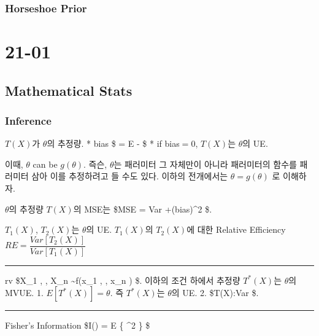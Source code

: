 \documentclass[
]{book}
\begin{document}
\hypertarget{horseshoe-prior}{%
\section{Horseshoe Prior}\label{horseshoe-prior}}

\hypertarget{part-21-01}{%
\part{21-01}\label{part-21-01}}

\hypertarget{mathematical-stats}{%
\chapter{Mathematical Stats}\label{mathematical-stats}}

\hypertarget{inference}{%
\section{Inference}\label{inference}}

\(T(X)\)가 \(\theta\)의 추정량.
* bias \$ = E \left[ T(X) \right] - \theta\$
* if bias\(=0\), \(T(X)\)는 \(\theta\)의 UE.

이때, \(\theta\) can be \(g(\theta)\). 즉슨, \(\theta\)는 패러미터 그 자체만이 아니라 패러미터의 함수를 패러미터 삼아 이를 추정하려고 들 수도 있다. 이하의 전개에서는 \(\theta = g(\theta)\) 로 이해하자.

\(\theta\)의 추정량 \(T(X)\)의 MSE는 \$MSE = Var \left[ T(X) \right] +(bias)\^{}2 \$.

\(T_1(X)\), \(T_2(X)\)는 \(\theta\)의 UE. \(T_1(X)\)의 \(T_2(X)\)에 대한 Relative Efficiency \(RE= \dfrac {Var \left[ T_2 (X) \right]} {Var \left[ T_1 (X) \right]}\)

\begin{center}\rule{0.5\linewidth}{0.5pt}\end{center}

rv \$X\_1 , \cdots, X\_n \sim f(x\_1 , \cdots, x\_n \rvert \theta) \$. 이하의 조건 하에서 추정량 \(T^\ast (X)\)는 \(\theta\)의 MVUE.
1. \(E \left [ T^\ast (X) \right] = \theta\). 즉 \(T^\ast (X)\)는 \(\theta\)의 UE.
2. \$\forall T(X):Var   \le \left [ T (X) \right] \$.

\begin{center}\rule{0.5\linewidth}{0.5pt}\end{center}

Fisher's Information \$I(\theta) = E \left\{ \^{}2 \right\} \$
\end{document}
